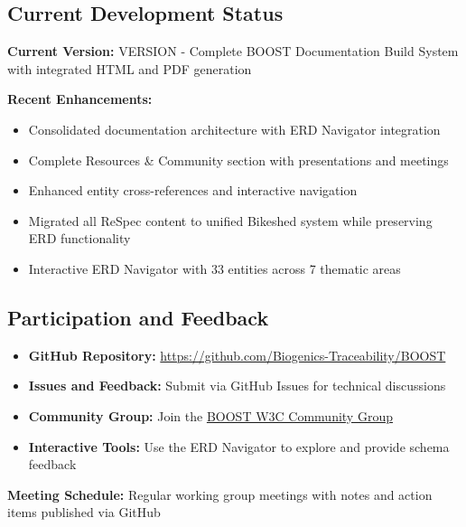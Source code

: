 \subsection{Current Development Status}
\label{sec:development-status}

\begin{important}[title=Current Version Information]
\textbf{Current Version:} {{VERSION}} - Complete BOOST Documentation Build System with integrated HTML and PDF generation

\textbf{Recent Enhancements:}
\begin{itemize}
    \item Consolidated documentation architecture with ERD Navigator integration
    \item Complete Resources \& Community section with presentations and meetings
    \item Enhanced entity cross-references and interactive navigation  
    \item Migrated all ReSpec content to unified Bikeshed system while preserving ERD functionality
    \item Interactive ERD Navigator with 33 entities across 7 thematic areas
\end{itemize}
\end{important}

\subsection{Participation and Feedback}
\label{sec:participation}

\begin{informative}[title=How to Contribute]
\begin{itemize}
    \item \textbf{GitHub Repository:} \url{https://github.com/Biogenics-Traceability/BOOST}
    \item \textbf{Issues and Feedback:} Submit via GitHub Issues for technical discussions
    \item \textbf{Community Group:} Join the \href{https://www.w3.org/community/boost-01/}{BOOST W3C Community Group}
    \item \textbf{Interactive Tools:} Use the ERD Navigator to explore and provide schema feedback
\end{itemize}

\textbf{Meeting Schedule:} Regular working group meetings with notes and action items published via GitHub
\end{informative}